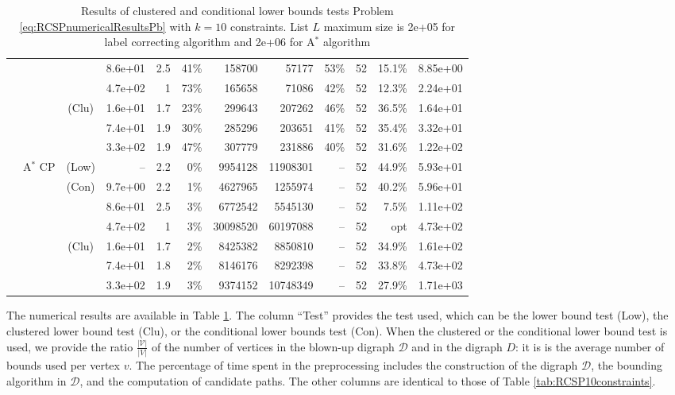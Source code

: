 \documentclass[11pt]{amsart}
\newenvironment{outdent}
{\begin{list}{}{\leftmargin-2cm\rightmargin\leftmargin}\centering\item\relax}
{\end{list}\ignorespacesafterend}
\theoremstyle{plain}
\theoremstyle{remark}
\begin{document}
\begin{table}
\begin{outdent}
\begin{small}
\begin{tabular}{|l|ccr|rr|rrr|rr|r|}
& &  & 8.6e+01 & 2.5 & 41\% & 158700 & 57177 & 53\% &52 & 15.1\% & 8.85e+00 \\
& &  & 4.7e+02 & 1 & 73\% & 165658 & 71086 & 42\% &52 & 12.3\% & 2.24e+01 \\
& & (Clu) & 1.6e+01 & 1.7 & 23\% & 299643 & 207262 & 46\% &52 & 36.5\% & 1.64e+01 \\
& &  & 7.4e+01 & 1.9 & 30\% & 285296 & 203651 & 41\% &52 & 35.4\% & 3.32e+01 \\
& &  & 3.3e+02 & 1.9 & 47\% & 307779 & 231886 & 40\% &52 & 31.6\% & 1.22e+02 \\
&A$^*$ CP & (Low) & --  &2.2 & 0\% & 9954128 & 11908301 & -- &52 & 44.9\% & 5.93e+01 \\
& & (Con) & 9.7e+00 & 2.2 & 1\% & 4627965 & 1255974 & -- &52 & 40.2\% & 5.96e+01 \\
& &  & 8.6e+01 & 2.5 & 3\% & 6772542 & 5545130 & -- &52 & 7.5\% & 1.11e+02 \\
& &  & 4.7e+02 & 1 & 3\% & 30098520 & 60197088 & -- &52 & opt & 4.73e+02 \\
& & (Clu) & 1.6e+01 & 1.7 & 2\% & 8425382 & 8850810 & -- &52 & 34.9\% & 1.61e+02 \\
& &  & 7.4e+01 & 1.8 & 2\% & 8146176 & 8292398 & -- &52 & 33.8\% & 4.73e+02 \\
& &  & 3.3e+02 & 1.9 & 3\% & 9374152 & 10748349 & -- &52 & 27.9\% & 1.71e+03 \\
\hline
\end{tabular}
\end{small}
\end{outdent}
\caption{Results of clustered and conditional lower bounds tests Problem \eqref{eq:RCSPnumericalResultsPb} with $k=10$ constraints. List $L$ maximum size is 2e+05 for label correcting algorithm and 2e+06 for A$^{*}$ algorithm}\label{tab:clusCondRes}
\end{table}

The numerical results are available in Table \ref{tab:clusCondRes}. The column ``Test'' provides the test used, which can be the lower bound test (Low), the clustered lower bound test (Clu), or the conditional lower bounds test (Con). When the clustered or the conditional lower bound test is used, we provide the ratio $\frac{|\mathcal{V}|}{|V|}$ of the number of vertices in the blown-up digraph $\mathcal{D}$ and in the digraph $D$: it is is the average number of bounds used per vertex $v$. The percentage of time spent in the preprocessing includes the construction of the digraph $\mathcal{D}$, the bounding algorithm in $\mathcal{D}$, and the computation of candidate paths. The other columns are identical to those of Table \ref{tab:RCSP10constraints}. 
\end{document}
